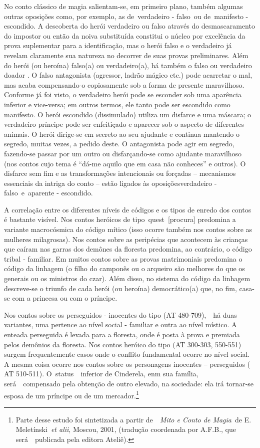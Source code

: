 No conto clássico de magia salientam-se, em primeiro plano, também
algumas outras oposições como, por exemplo, as de~{verdadeiro -
falso}~ou de~{manifesto - escondido}. A descoberta do herói verdadeiro
ou falso através do desmascaramento do impostor ou então da noiva
substituída constitui o núcleo por excelência da prova suplementar para
a identificação, mas o herói falso e o verdadeiro já revelam claramente
sua natureza no decorrer de suas provas preliminares. Além do herói (ou
heroína) falso(a) ou verdadeiro(a), há também o falso ou verdadeiro
doador . O falso antagonista (agressor, ladrão mágico etc.) pode
acarretar o mal, mas acaba compensando-o copiosamente sob a forma de
presente maravilhoso. Conforme já foi visto, o verdadeiro herói pode se
esconder sob uma aparência inferior e vice-versa; em outros termos, ele
tanto pode ser escondido como manifesto. O herói escondido (dissimulado)
utiliza um disfarce e uma máscara; o verdadeiro príncipe pode ser
enfeitiçado e aparecer sob o aspecto de diferentes animais. O herói
dirige-se em secreto ao seu ajudante e continua mantendo o segredo,
muitas vezes, a pedido deste. O antagonista pode agir em segredo,
fazendo-se passar por um outro ou disfarçando-se como ajudante
maravilhoso (nos contos cujo tema é ``dá-me aquilo que em casa não
conheces'' e outros). O disfarce sem fim e as transformações
intencionais ou forçadas -- mecanismos essenciais da intriga do conto --
estão ligados às oposições{verdadeiro - falso}~e~{aparente - escondido}.

A correlação entre os diferentes níveis de códigos e os tipos de enredo
dos contos é bastante visível. Nos contos heróicos de
tipo~{quest}~{[}procura{]} predomina a variante macrocósmica do código
mítico (isso ocorre também nos contos sobre as mulheres milagrosas). Nos
contos sobre as peripécias que acontecem às crianças que caíram nas
garras dos demônes da floresta predomina, ao contrário, o código tribal
- familiar. Em muitos contos sobre as provas matrimoniais predomina o
código da linhagem (o filho do camponês ou o arqueiro são melhores do
que os generais ou os ministros do czar). Além disso, no sistema do
código da linhagem descreve-se o triunfo de cada herói (ou heroína)
democrático(a) que, no fim, casa-se com a princesa ou com o príncipe.

Nos contos sobre os perseguidos - inocentes do tipo (AT 480-709),~~há
duas variantes, uma pertence ao nível social - familiar e outra ao nível
místico. A enteada perseguida é levada para a floresta, onde é posta à
prova e premiada pelos demônios da floresta. Nos contos heróico do tipo
(AT 300-303, 550-551) surgem frequentemente casos onde o conflito
fundamental ocorre no nível social. A mesma coisa ocorre nos contos
sobre os personagens inocentes -- perseguidos ( AT 510-511).
O~{status~}~inferior de Cinderela, enm sua família, será~~compensado
pela obtenção de outro elevado, na sociedade: ela irá tornar-se esposa
de um príncipe ou de um mercador.\footnote{Parte desse estudo foi
  sintetizada a partir de~~\emph{Mito e Conto de Magia}~de E.
  Meletínski~\emph{et alii}, Moscou, 2001, (tradução coordenada por
  A.F.B., que será~~publicada pela editora Ateliê).}

